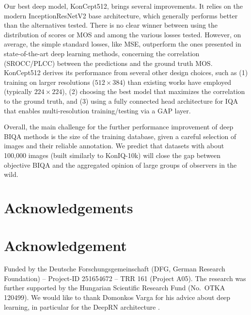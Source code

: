 \documentclass[10pt,journal,compsoc]{IEEEtran}
\begin{document}
Our best deep model, {KonCept512}, brings several improvements. It relies on the modern InceptionResNetV2 base architecture, which generally performs better than the alternatives tested. There is no clear winner between using the distribution of scores or MOS and among the various losses tested. However, on average, the simple standard losses, like MSE, outperform the ones presented in state-of-the-art deep learning methods, concerning the correlation (SROCC/PLCC) between the predictions and the ground truth MOS. {KonCept512} derives its performance from several other design choices, such as (1) training on larger resolutions ($512\times 384$) than existing works have employed (typically $224\times 224$), (2) choosing the best model that maximizes the correlation to the ground truth, and (3) using a fully connected head architecture for IQA that enables multi-resolution training/testing via a GAP layer.

Overall, the main challenge for the further performance improvement of deep BIQA methods is the size of the training database, given a careful selection of images and their reliable annotation. We predict that datasets with about 100,000 images (built similarly to KonIQ-10k) will close the gap between objective BIQA and the aggregated opinion of large groups of observers in the wild.





















\ifCLASSOPTIONcompsoc
\section*{Acknowledgements}
\else
\section*{Acknowledgement}
\fi
Funded by the Deutsche Forschungsgemeinschaft (DFG, German Research Foundation) -- Project-ID 251654672 -- TRR 161 (Project A05).
The research was further supported by the Hungarian Scientific Research Fund (No.\ OTKA 120499). We would like to thank Domonkos Varga for his advice about deep learning, in particular for the DeepRN architecture \cite{varga2018deeprn}.
 
\end{document}
